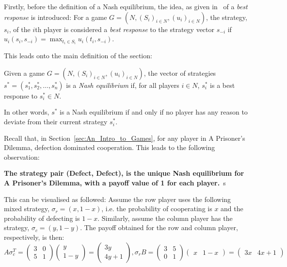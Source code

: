 Firstly, before the definition of a Nash equilibrium, the idea, as given in~\cite{maschler_solan_zamir_2013} of a \textit{best response} is introduced:
For a game \(G=(N, (S_{i})_{i \in N}, (u_{i})_{i \in N})\), the strategy,
\(s_{i}\), of the \(i\)th player is considered a \textit{best response} to the
strategy vector \(s_{-i}\) if \(u_{i}(s_{i}, s_{-i}) = \max_{t_{i} \in
S_{i}}u_{i}(t_{i}, s_{-i})\).

This leads onto the main definition of the section:
\begin{definition}\label{def:NE}
    Given a game \(G=(N, (S_{i})_{i \in N}, (u_{i})_{i \in N})\), the vector of
    strategies \(s^{*} = (s_{1}^{*}, s_{2}^{*}, \ldots, s_{n}^{*})\) is a
    \textit{Nash equilibrium} if, for all players \(i \in N\), \(s_{i}^{*}\) is a best response to \(s_{i}^{*} \in N\).~\cite{maschler_solan_zamir_2013}
\end{definition}
In other words, \(s^{*}\) is a Nash equilibrium if and only if no player has any
reason to deviate from their current strategy \(s_{i}^{*}\).

Recall that, in Section~\ref{sec:An_Intro_to_Games}, for any player in A
Prisoner's Dilemma, defection dominated cooperation. This leads to the following
observation:
\begin{center}
    \textbf{The strategy pair (Defect, Defect), is the unique Nash equilibrium for A Prisoner's Dilemma, with a payoff value of 1 for each player.}~s\cite{maschler_solan_zamir_2013}
\end{center}
This can be visualised as followed:
Assume the row player uses the following mixed strategy, \(\sigma_{r} = (x,
1-x)\), i.e. the probability of cooperating is \(x\) and the probability of
defecting is \(1-x\). Similarly, assume the column player has 
the strategy, \(\sigma_{c} = (y, 1-y)\). The payoff obtained for the row and column player, respectively, is then:
\[
    A\sigma_{c}^T = \begin{pmatrix}
        3 & 0 \\
        5 & 1
    \end{pmatrix} \begin{pmatrix}
        y \\
        1-y
    \end{pmatrix} = \begin{pmatrix}
        3y \\
        4y + 1
    \end{pmatrix},

    \sigma_{r}B = \begin{pmatrix}
        3 & 5 \\
        0 & 1        
    \end{pmatrix} \begin{pmatrix}
        x & 1-x
    \end{pmatrix} = \begin{pmatrix}
        3x & 4x + 1
    \end{pmatrix}
\]

